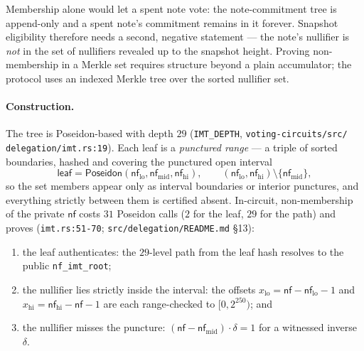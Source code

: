 \documentclass[11pt,a4paper]{article}
\theoremstyle{definition}
\newcommand{\nfsym}{\mathsf{nf}}
\begin{document}
Membership alone would let a spent note vote: the note-commitment tree is
append-only and a spent note's commitment remains in it forever. Snapshot
eligibility therefore needs a second, negative statement --- the note's
nullifier is \emph{not} in the set of nullifiers revealed up to the snapshot
height. Proving non-membership in a Merkle set requires structure beyond a
plain accumulator; the protocol uses an indexed Merkle tree over the sorted
nullifier set.

\paragraph{Construction.} The tree is Poseidon-based with depth $29$
(\texttt{IMT\_DEPTH},
\texttt{voting-circuits/\allowbreak src/\allowbreak
delegation/\allowbreak imt.rs:19}).
Each leaf is a \emph{punctured range} --- a triple of sorted boundaries,
hashed and covering the punctured open interval
\[
\mathsf{leaf} =
\mathsf{Poseidon}(\nfsym_{\mathrm{lo}}, \nfsym_{\mathrm{mid}},
\nfsym_{\mathrm{hi}}),
\qquad
(\nfsym_{\mathrm{lo}}, \nfsym_{\mathrm{hi}}) \setminus
\{\nfsym_{\mathrm{mid}}\},
\]
so the set members appear only as interval boundaries or interior
punctures, and everything strictly between them is certified absent.
In-circuit, non-membership of the private $\nfsym$ costs
$31$ Poseidon calls ($2$ for the leaf, $29$ for the path) and proves
(\texttt{imt.rs:51-70}; \texttt{src/delegation/README.md} \S13):
\begin{enumerate}
\item the leaf authenticates: the $29$-level path from the leaf hash
  resolves to the public \texttt{nf\_imt\_root};
\item the nullifier lies strictly inside the interval: the offsets
  $x_{\mathrm{lo}} = \nfsym - \nfsym_{\mathrm{lo}} - 1$ and
  $x_{\mathrm{hi}} = \nfsym_{\mathrm{hi}} - \nfsym - 1$ are each
  range-checked to $[0, 2^{250})$; and
\item the nullifier misses the puncture:
  $(\nfsym - \nfsym_{\mathrm{mid}}) \cdot \delta = 1$ for a witnessed
  inverse $\delta$.
\end{enumerate}
\end{document}
